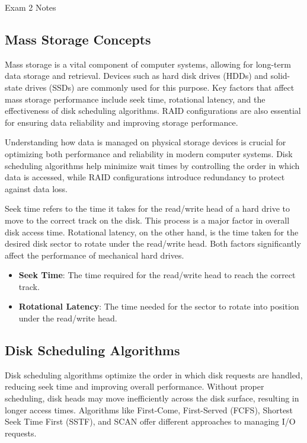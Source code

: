 \begin{examnotes}{Exam 2 Notes}
    \subsection*{Mass Storage Concepts}

    Mass storage is a vital component of computer systems, allowing for long-term data storage and retrieval. Devices such as hard disk drives (HDDs) and solid-state drives (SSDs) are commonly used for this purpose. Key factors that affect mass storage performance include seek time, rotational latency, and the effectiveness of disk scheduling algorithms. RAID configurations are also essential for ensuring data reliability and improving storage performance.
    
    Understanding how data is managed on physical storage devices is crucial for optimizing both performance and reliability in modern computer systems. Disk scheduling algorithms help minimize wait times by controlling the order in which data is accessed, while RAID configurations introduce redundancy to protect against data loss.
    
    \begin{highlight}
    Seek time refers to the time it takes for the read/write head of a hard drive to move to the correct track on the disk. This process is a major factor in overall disk access time. Rotational latency, on the other hand, is the time taken for the desired disk sector to rotate under the read/write head. Both factors significantly affect the performance of mechanical hard drives.
    
    \begin{itemize}
        \item \textbf{Seek Time}: The time required for the read/write head to reach the correct track.
        \item \textbf{Rotational Latency}: The time needed for the sector to rotate into position under the read/write head.
    \end{itemize}
    \end{highlight}
    
    \subsection*{Disk Scheduling Algorithms}
    
    Disk scheduling algorithms optimize the order in which disk requests are handled, reducing seek time and improving overall performance. Without proper scheduling, disk heads may move inefficiently across the disk surface, resulting in longer access times. Algorithms like First-Come, First-Served (FCFS), Shortest Seek Time First (SSTF), and SCAN offer different approaches to managing I/O requests.
    

\end{examnotes}
